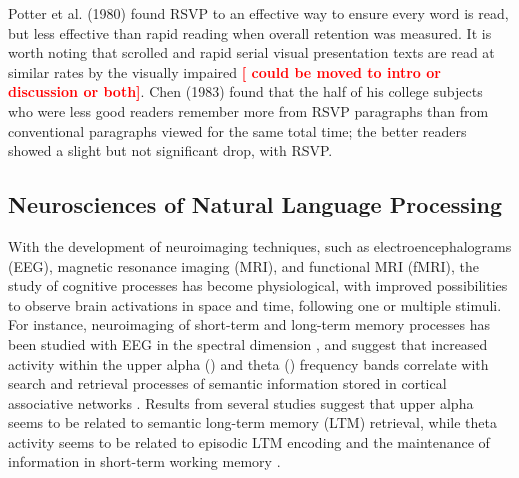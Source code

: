 Potter et al. (1980) found RSVP to an effective way to ensure every word is read, but less effective than rapid reading when overall retention was measured. It is worth noting that scrolled and rapid serial visual presentation texts are read at similar rates by the visually impaired \cite{fine1995scrolled} \textcolor{red}{\bf [ could be moved to intro or discussion or both]}. Chen (1983) found that the half of his college subjects who were less good readers remember more from RSVP paragraphs than from conventional paragraphs viewed for the same total time; the better readers showed a slight but not significant drop, with RSVP.

\subsection{Neurosciences of Natural Language Processing}
With the development of neuroimaging techniques, such as electroencephalograms (EEG), magnetic resonance imaging (MRI), and functional MRI (fMRI), the study of cognitive processes has become physiological, with improved possibilities to observe brain activations in space and time, following one or multiple stimuli. For instance, neuroimaging of short-term and long-term memory processes has been studied with EEG in the spectral dimension \cite{klimesch1999eeg,khader2011eeg}, and suggest that increased activity within the upper alpha () and theta () frequency bands correlate with search and retrieval processes of semantic information stored in cortical associative networks \cite{klimesch1996memory,klimesch1990alpha}. Results from several studies \cite{khader2011eeg} suggest that upper alpha seems to be related to semantic long-term memory (LTM) retrieval, while theta activity seems to be related to episodic LTM encoding \cite{} and the maintenance of information in short-term working memory \cite{}. 


